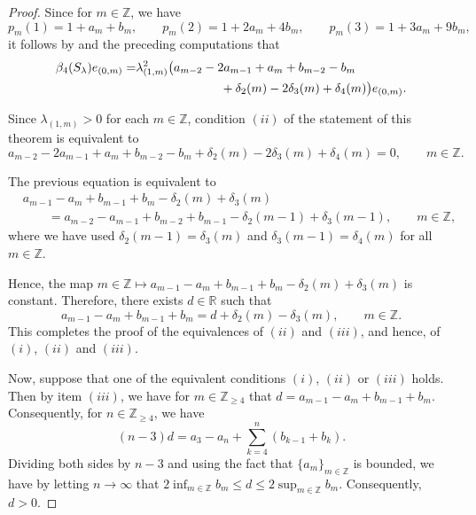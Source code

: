 \documentclass[11pt, reqno, a4paper]{amsart}
\theoremstyle{definition}
\renewcommand{\le}{\leqslant}
\renewcommand{\ge}{\geqslant}
\newcommand{\R}{\mathbb R}
\newcommand{\Z}{\mathbb Z}
\numberwithin{equation}{section}
\begin{document}
\begin{proof}
        Since for $m \in \Z$, we have
        \begin{equation*}
            p_m(1)=1+a_m+b_m,\qquad
            p_m(2)=1+2a_m+4b_m,\qquad
            p_m(3)=1+3a_m+9b_m,
        \end{equation*}
        it follows by  and the preceding computations that 
        \begin{equation*}
            \begin{aligned}
            \beta_4(S_\lambda)e_{(0,m)} =& \lambda_{(1,m)}^2 \big( a_{m-2}-2a_{m-1}+a_m+b_{m-2}-b_m\\
                                        &\hspace{24mm} +\delta_2(m)-2\delta_3(m)+\delta_4(m) \big)e_{(0,m)}.
            \end{aligned}
        \end{equation*}
    
        Since $\lambda_{(1,m)}>0$ for each $m \in \Z$, condition $(ii)$ of the statement of this theorem is equivalent to
            \begin{equation*}
                a_{m-2}-2a_{m-1}+a_m+b_{m-2}-b_m +\delta_2(m)-2\delta_3(m)+\delta_4(m)=0, \qquad m \in \Z.
            \end{equation*}
    
        The previous equation is equivalent to
            \begin{equation*}
                \begin{aligned}
                    &a_{m-1}-a_m+b_{m-1}+b_m-\delta_2(m)+\delta_3(m)\\
                    &\qquad = a_{m-2}-a_{m-1}+b_{m-2}+b_{m-1} -\delta_2(m-1)+\delta_3(m-1), \qquad m \in \Z,
                \end{aligned}
            \end{equation*}
        where we have used $\delta_2(m-1)=\delta_3(m)$ and $\delta_3(m-1)=\delta_4(m)$ for all $m \in \Z$.
    
        Hence, the map $m\in\Z\mapsto a_{m-1}-a_m+b_{m-1}+b_m-\delta_2(m)+\delta_3(m)$ is constant. Therefore, there exists $d\in\R$ such that
            \begin{equation*}
                a_{m-1}-a_m+b_{m-1}+b_m = d+\delta_2(m)-\delta_3(m),\qquad m\in\Z.
            \end{equation*}
        This completes the proof of the equivalences of $(ii)$ and $(iii)$, and hence, of $(i)$, $(ii)$ and $(iii)$.
    
        Now, suppose that one of the equivalent conditions $(i)$, $(ii)$ or $(iii)$ holds. Then by item $(iii)$, we have for $m \in \Z_{\ge 4}$ that $d= a_{m-1} - a_{m} + b_{m-1} + b_{m}$. Consequently, for $n \in \Z_{\ge 4}$, we have 
        \begin{equation*}
            (n-3) d = a_3 - a_{n} + \sum_{k=4}^{n} (b_{k-1} + b_k).
        \end{equation*}
        Dividing both sides by $n-3$ and using the fact that $\{ a_m \}_{m \in \Z}$ is bounded, we have by letting $n \to \infty$ that  $2\inf_{m\in\Z}b_m \le d \le 2\sup_{m\in\Z}b_m$. Consequently, $d > 0$.
        

\end{proof}
\end{document}
